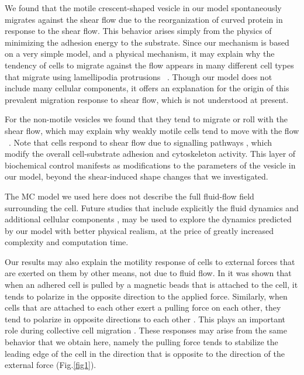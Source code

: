 \documentclass[
reprint,
superscriptaddress,
 amsmath,amssymb,
 aps,
prl,
floatfix]{revtex4-2}
\begin{document}
We found that the motile crescent-shaped vesicle in our model spontaneously migrates against the shear flow due to the reorganization of curved protein in response to the shear flow. This behavior arises simply from the physics of minimizing the adhesion energy to the substrate. Since our mechanism is based on a very simple model, and a physical mechanism, it may explain why the tendency of cells to migrate against the flow appears in many different cell types that migrate using lamellipodia protrusions ~\cite{steiner2010differential,Dominguez2015,Anderson2019,Ostrowski2014,alghanem2021swell1,follain2018hemodynamic,decave2003shear,Fache2005,Dalous2008}. Though our model does not include many cellular components, it offers an explanation for the origin of this prevalent migration response to shear flow, which is not understood at present.

For the non-motile vesicles we found that they tend to migrate or roll with the shear flow, which may explain why weakly motile cells tend to move with the flow ~\cite{decave2003shear, Dikeman2008, Fache2005}. Note that cells respond to shear flow due to signalling pathways \cite{rose2007integrin,chistiakov2017effects}, which modify the overall cell-substrate adhesion and cytoskeleton activity. This layer of biochemical control manifests as modifications to the parameters of the vesicle in our model, beyond the shear-induced shape changes that we investigated. 

The MC model we used here does not describe the full fluid-flow field surrounding the cell. Future studies that include explicitly the fluid dynamics \cite{noguchi2004fluid,mauer2018flow} and additional cellular components \cite{dabagh2017mechanotransmission}, may be used to explore the dynamics predicted by our model with better physical realism, at the price of greatly increased complexity and computation time. 

Our results may also explain the motility response of cells to external forces that are exerted on them by other means, not due to fluid flow. In \cite{weber2012mechanoresponsive} it was shown that when an adhered cell is pulled by a magnetic beads that is attached to the cell, it tends to polarize in the opposite direction to the applied force. Similarly, when cells that are attached to each other exert a pulling force on each other, they tend to polarize in opposite directions to each other \cite{weber2012mechanoresponsive}. This plays an important role during collective cell migration \cite{mayor2016front}. These responses may arise from the same behavior that we obtain here, namely the pulling force tends to stabilize the leading edge of the cell in the direction that is opposite to the direction of the external force (Fig.\ref{fig1}).
\end{document}
